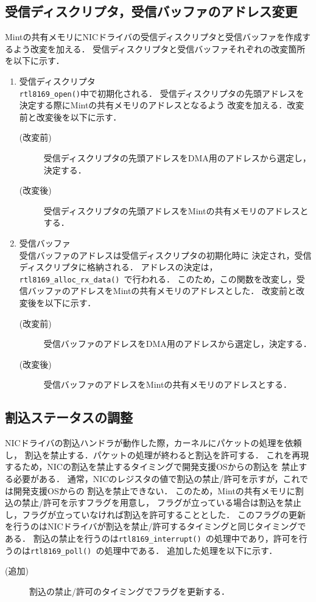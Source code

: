 \documentclass[12pt]{jsarticle}
\begin{document}
\subsection{受信ディスクリプタ，受信バッファのアドレス変更}
Mintの共有メモリにNICドライバの受信ディスクリプタと受信バッファを作成するよう改変を加える．
受信ディスクリプタと受信バッファそれぞれの改変箇所を以下に示す．
\begin{enumerate}
    \item 受信ディスクリプタ\\
        {\tt rtl8169\_open()}中で初期化される．
        受信ディスクリプタの先頭アドレスを決定する際にMintの共有メモリのアドレスとなるよう
        改変を加える．改変前と改変後を以下に示す．
        \begin{description}
            \item[(改変前)]受信ディスクリプタの先頭アドレスをDMA用のアドレスから選定し，決定する．
            \item[(改変後)]受信ディスクリプタの先頭アドレスをMintの共有メモリのアドレスとする．
        \end{description}
    \item 受信バッファ\\
        受信バッファのアドレスは受信ディスクリプタの初期化時に
        決定され，受信ディスクリプタに格納される．
        アドレスの決定は，{\tt rtl8169\_alloc\_rx\_data() }で行われる．
        このため，この関数を改変し，受信バッファのアドレスをMintの共有メモリのアドレスとした．
        改変前と改変後を以下に示す．
        \begin{description}
            \item[(改変前)]受信バッファのアドレスをDMA用のアドレスから選定し，決定する．
            \item[(改変後)]受信バッファのアドレスをMintの共有メモリのアドレスとする．
        \end{description}
\end{enumerate}

\subsection{割込ステータスの調整}
NICドライバの割込ハンドラが動作した際，カーネルにパケットの処理を依頼し，
割込を禁止する．パケットの処理が終わると割込を許可する．
これを再現するため，NICの割込を禁止するタイミングで開発支援OSからの割込を
禁止する必要がある．
通常，NICのレジスタの値で割込の禁止/許可を示すが，これでは開発支援OSからの
割込を禁止できない．
このため，Mintの共有メモリに割込の禁止/許可を示すフラグを用意し，
フラグが立っている場合は割込を禁止し，フラグが立っていなければ割込を許可することとした．
このフラグの更新を行うのはNICドライバが割込を禁止/許可するタイミングと同じタイミングである．
割込の禁止を行うのは{\tt rtl8169\_interrupt() }の処理中であり，許可を行うのは{\tt rtl8169\_poll() }の処理中である．
追加した処理を以下に示す．
\begin{description}
    \item[(追加)]割込の禁止/許可のタイミングでフラグを更新する．
\end{description}
\end{document}
